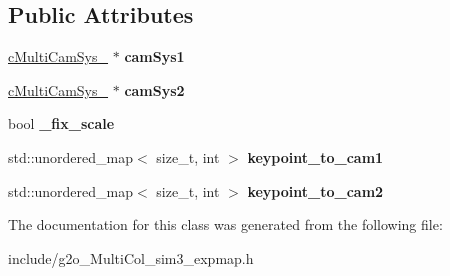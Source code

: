 \subsection*{Public Attributes}
\begin{DoxyCompactItemize}
\item 
\hyperlink{classMultiColSLAM_1_1cMultiCamSys__}{c\+Multi\+Cam\+Sys\+\_\+} $\ast$ {\bfseries cam\+Sys1}\hypertarget{classMultiColSLAM_1_1VertexSim3Expmap__Multi_a6f0f67d20c6a54551e84c7dfc9b12e97}{}\label{classMultiColSLAM_1_1VertexSim3Expmap__Multi_a6f0f67d20c6a54551e84c7dfc9b12e97}

\item 
\hyperlink{classMultiColSLAM_1_1cMultiCamSys__}{c\+Multi\+Cam\+Sys\+\_\+} $\ast$ {\bfseries cam\+Sys2}\hypertarget{classMultiColSLAM_1_1VertexSim3Expmap__Multi_a16032c67f53b74c97969a97b1c207587}{}\label{classMultiColSLAM_1_1VertexSim3Expmap__Multi_a16032c67f53b74c97969a97b1c207587}

\item 
bool {\bfseries \+\_\+fix\+\_\+scale}\hypertarget{classMultiColSLAM_1_1VertexSim3Expmap__Multi_a905badf8def1b61cace42846b91a88a2}{}\label{classMultiColSLAM_1_1VertexSim3Expmap__Multi_a905badf8def1b61cace42846b91a88a2}

\item 
std\+::unordered\+\_\+map$<$ size\+\_\+t, int $>$ {\bfseries keypoint\+\_\+to\+\_\+cam1}\hypertarget{classMultiColSLAM_1_1VertexSim3Expmap__Multi_aaec9c7acb3643544e68e1540b7d079b0}{}\label{classMultiColSLAM_1_1VertexSim3Expmap__Multi_aaec9c7acb3643544e68e1540b7d079b0}

\item 
std\+::unordered\+\_\+map$<$ size\+\_\+t, int $>$ {\bfseries keypoint\+\_\+to\+\_\+cam2}\hypertarget{classMultiColSLAM_1_1VertexSim3Expmap__Multi_a6ef1ee9d62791dd19bb653c41d3eeb65}{}\label{classMultiColSLAM_1_1VertexSim3Expmap__Multi_a6ef1ee9d62791dd19bb653c41d3eeb65}

\end{DoxyCompactItemize}


The documentation for this class was generated from the following file\+:\begin{DoxyCompactItemize}
\item 
include/g2o\+\_\+\+Multi\+Col\+\_\+sim3\+\_\+expmap.\+h\end{DoxyCompactItemize}
